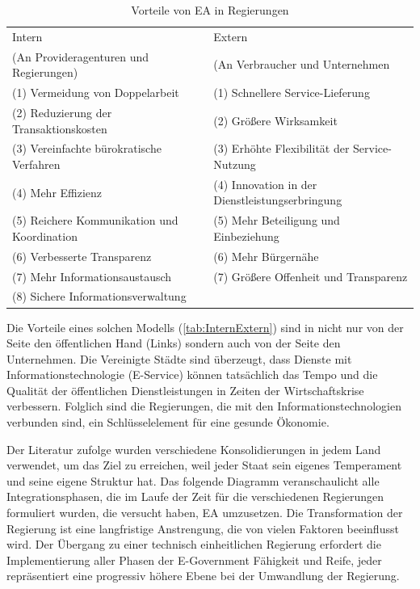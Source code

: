 \documentclass[
	doc,
	a4paper,
	helv
	]{apa6}
\begin{document}
\begin{table}[!htbp]
\caption{Vorteile von EA in Regierungen \autocite{Pallab2010}}
\begin{center}
\begin{tabularx}{\textwidth}{|X|X|}
\hline
Intern & Extern \\
(An Provideragenturen und Regierungen) & (An Verbraucher und Unternehmen \\\hline
(1) Vermeidung von Doppelarbeit				& (1) Schnellere Service-Lieferung \\
(2) Reduzierung der Transaktionskosten		& (2) Größere Wirksamkeit \\
(3) Vereinfachte bürokratische Verfahren	& (3) Erhöhte Flexibilität der Service-Nutzung \\
(4) Mehr Effizienz							& (4) Innovation in der Dienstleistungserbringung \\
(5) Reichere Kommunikation und Koordination	& (5) Mehr Beteiligung und Einbeziehung \\
(6) Verbesserte Transparenz					& (6) Mehr Bürgernähe \\
(7) Mehr Informationsaustausch				& (7) Größere Offenheit und Transparenz \\
(8) Sichere Informationsverwaltung			& \\\hline
\end{tabularx}
\end{center}
\label{tab:InternExtern}
\end{table}

Die Vorteile eines solchen Modells (\autoref{tab:InternExtern}) sind in  nicht nur von der Seite den öffentlichen Hand (Links) sondern auch von der Seite den Unternehmen. Die Vereinigte Städte sind überzeugt, dass  Dienste mit Informationstechnologie (E-Service) können tatsächlich das Tempo und die Qualität der öffentlichen Dienstleistungen in Zeiten der Wirtschaftskrise verbessern. Folglich sind die Regierungen, die mit den Informationstechnologien verbunden sind, ein Schlüsselelement für eine gesunde Ökonomie.

Der Literatur zufolge wurden verschiedene Konsolidierungen in jedem Land verwendet, um das Ziel zu erreichen, weil jeder Staat  sein eigenes Temperament und seine eigene Struktur hat. Das folgende Diagramm veranschaulicht alle Integrationsphasen, die im Laufe der Zeit für die verschiedenen Regierungen formuliert wurden, die versucht haben, EA umzusetzen. Die Transformation der Regierung ist eine langfristige Anstrengung, die von vielen Faktoren beeinflusst wird. Der Übergang zu einer technisch einheitlichen Regierung erfordert die Implementierung aller Phasen der E-Government Fähigkeit und Reife, jeder repräsentiert eine progressiv höhere Ebene bei der Umwandlung der Regierung.
\end{document}
